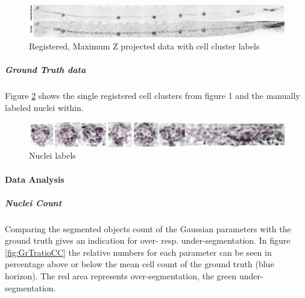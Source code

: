 \documentclass[11pt,singlespacinge,twoside]{reedthesis} %
\begin{document}
\begin{figure}

{\centering \includegraphics[width=0.9\linewidth]{figure/02-MaMo/GrTr/ClusterAnal/B06SB1P05_montage} 

}

\caption{Registered, Maximum Z projected data with cell cluster labels}\label{fig:maxllreg}
\end{figure}
\hypertarget{ground-truth-data}{%
\subparagraph{Ground Truth data}\label{ground-truth-data}}

Figure \ref{fig:countP05} shows the single registered cell clusters from figure 1 and the manually labeled nuclei within.


\begin{figure}

{\centering \includegraphics[width=0.9\linewidth]{figure/02-MaMo/GrTr/ClusterAnal/count_P05} 

}

\caption{Nuclei labels}\label{fig:countP05}
\end{figure}
\hypertarget{data-analysis}{%
\paragraph{Data Analysis}\label{data-analysis}}

\hypertarget{nuclei-count}{%
\subparagraph{Nuclei Count}\label{nuclei-count}}

Comparing the segmented objects count of the Gaussian parameters with the ground truth gives an indication for over- resp. under-segmentation. In figure \ref{fig:GrTratioCC} the relative numbers for each parameter can be seen in percentage above or below the mean cell count of the ground truth (blue horizon). The red area represents over-segmentation, the green under-segmentation.
\end{document}
